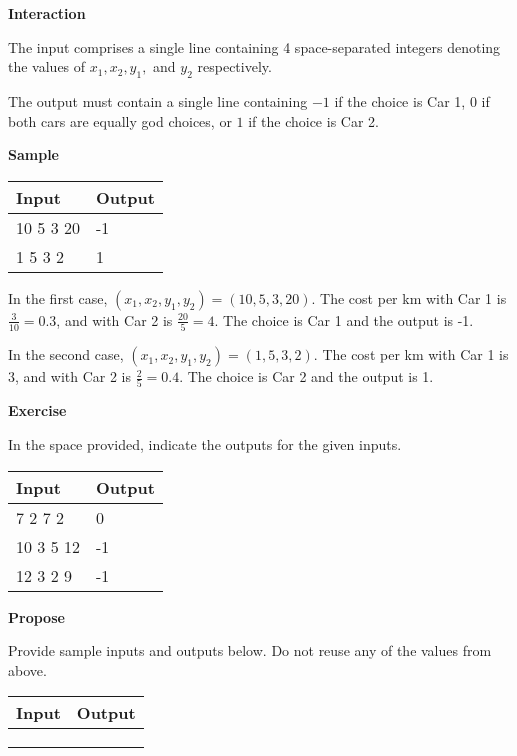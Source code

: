 \documentclass[a4paper]{exam}
\newcommand\heading[1]{\textbf{#1}}
\begin{document}
\begin{questions}
    \heading{Interaction}

    The input comprises a single line containing 4 space-separated integers denoting the values of $x_1,x_2,y_1,$ and $y_2$ respectively.

    The output must contain a single line containing $-1$ if the choice is Car 1, $0$ if both cars are equally god choices, or $1$ if the choice is Car 2.

    \heading{Sample}

    \begin{tabularx}{\textwidth}{|X|X|}
        \rowcolor{gray!50}
        \hline
        Input     & Output \\ \hline\hline
        10 5 3 20 & -1     \\\hline
        1 5 3 2   & 1      \\\hline
    \end{tabularx}

    In the first case, $(x_1,x_2,y_1,y_2) = (10,5,3,20)$. The cost per km with Car 1 is $\frac{3}{10} = 0.3$, and with Car 2 is $\frac{20}{5} = 4$. The choice is Car 1 and the output is -1.

    In the second case, $(x_1,x_2,y_1,y_2) = (1,5,3,2)$. The  cost per km with Car 1 is $3$, and with Car 2 is $\frac{2}{5} = 0.4$. The choice is Car 2 and the output is 1.

    \heading{Exercise}

    In the space provided, indicate the outputs for the given inputs.

    \begin{tabularx}{\textwidth}{|X|X|}
        \rowcolor{gray!50}
        \hline
        Input     & Output \\ \hline\hline
        7 2 7 2   & 0      \\\hline
        10 3 5 12 & -1     \\\hline
        12 3 2 9  & -1     \\\hline
    \end{tabularx}

    \heading{Propose}

    Provide sample inputs and outputs below. Do not reuse any of the values from above.

    \begin{tabularx}{\textwidth}{|X|X|}
        \rowcolor{gray!50}
        \hline
        Input & Output \\ \hline\hline
              &        \\\hline
              &        \\\hline
              &        \\\hline
    \end{tabularx}


\end{questions}
\end{document}
